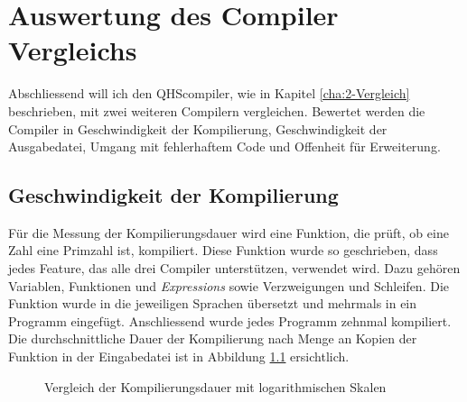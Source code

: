 \chapter{Auswertung des Compiler Vergleichs}
Abschliessend will ich den QHScompiler, wie in Kapitel \ref{cha:2-Vergleich} beschrieben, mit zwei weiteren Compilern vergleichen.
Bewertet werden die Compiler in Geschwindigkeit der Kompilierung, Geschwindigkeit der Ausgabedatei, Umgang mit fehlerhaftem Code und Offenheit für Erweiterung. 

\section{Geschwindigkeit der Kompilierung} \label{sec:compare-compilespeed}
Für die Messung der Kompilierungsdauer wird eine Funktion, die prüft, ob eine Zahl eine Primzahl ist, kompiliert. Diese Funktion wurde so geschrieben, dass jedes Feature, das alle drei Compiler unterstützen, verwendet wird.
Dazu gehören Variablen, Funktionen und \textit{Expressions} sowie Verzweigungen und Schleifen. Die Funktion wurde in die jeweiligen Sprachen übersetzt und mehrmals in ein Programm eingefügt.
Anschliessend wurde jedes Programm zehnmal kompiliert.
Die durchschnittliche Dauer der Kompilierung nach Menge an Kopien der Funktion in der Eingabedatei ist in Abbildung \ref{fig:compilespeed} ersichtlich.

\begin{figure}[h!]
\centering
\label{fig:compilespeed}
\caption{Vergleich der Kompilierungsdauer mit logarithmischen Skalen}
\end{figure}

